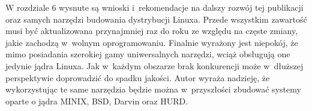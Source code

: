 \documentclass[printmode]{mgr}
\begin{document}
W rozdziale 6 wysnute są wnioski i~rekomendacje na dalszy rozwój tej publikacji oraz samych narzędzi budowania dystrybucji Linuxa.
Przede wszystkim zawartość musi być aktualizowana przynajmniej raz do roku ze względu na częste zmiany, jakie zachodzą w~wolnym oprogramowaniu.
Finalnie wyrażony jest niepokój, że mimo posiadania szerokiej gamy uniwersalnych narzędzi, wciąż obsługują one jedynie jądra Linuxa.
Jak w~każdym obszarze brak konkurencji może w~dłuższej perspektywie doprowadzić do spadku jakości.
Autor wyraża nadzieję, że wykorzystując te same narzędzia będzie można w~przyszłości zbudować systemy oparte o jądra MINIX, BSD, Darvin oraz HURD.
\end{document}
